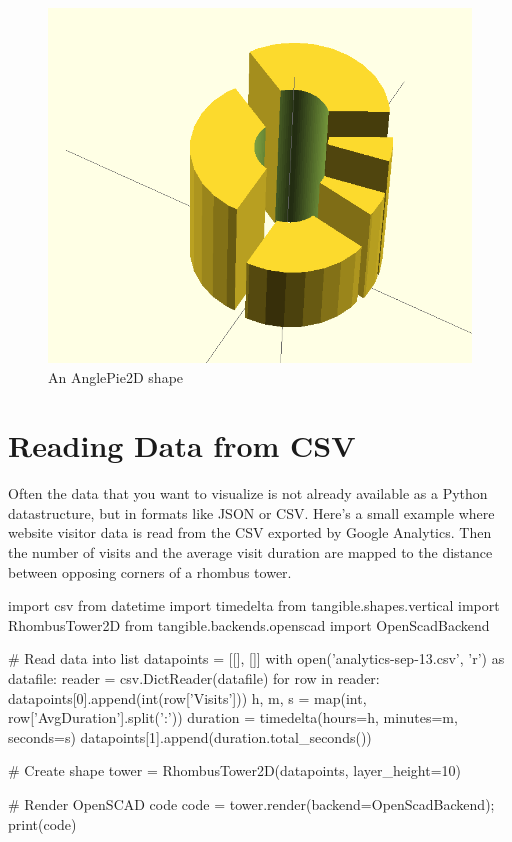 \begin{figure}[H]
	\centering
	\includegraphics[height=.3\textheight]{images/angle_pie.png}
	\caption{An AnglePie2D shape}
	\label{img:angle_pie}
\end{figure}


\newpage
\section{Reading Data from CSV}\label{sec:csv}

Often the data that you want to visualize is not already available as a Python
datastructure, but in formats like JSON or CSV. Here's a small example where
website visitor data is read from the CSV exported by Google Analytics. Then the
number of visits and the average visit duration are mapped to the distance
between opposing corners of a rhombus tower.

\vspace{.5\baselineskip}
\begin{pythoncode}
import csv
from datetime import timedelta
from tangible.shapes.vertical import RhombusTower2D
from tangible.backends.openscad import OpenScadBackend

# Read data into list
datapoints = [[], []]
with open('analytics-sep-13.csv', 'r') as datafile:
    reader = csv.DictReader(datafile)
    for row in reader:
        datapoints[0].append(int(row['Visits']))
        h, m, s = map(int, row['AvgDuration'].split(':'))
        duration = timedelta(hours=h, minutes=m, seconds=s)
        datapoints[1].append(duration.total_seconds())

# Create shape
tower = RhombusTower2D(datapoints, layer_height=10)

# Render OpenSCAD code
code = tower.render(backend=OpenScadBackend); print(code)
\end{pythoncode}
\vspace{.5\baselineskip}

